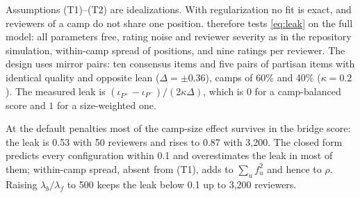 Assumptions (T1)--(T2) are idealizations. With regularization no fit is exact, and reviewers of a camp
do not share one position.  therefore tests \eqref{eq:leak} on the full model:
all parameters free, rating noise and reviewer severity as in the repository simulation,
within-camp spread of positions, and nine ratings per reviewer. The design uses mirror pairs:
ten consensus items and five pairs of partisan items with identical quality and opposite lean
($\Delta=\pm0.36$), camps of 60\% and 40\% ($\kappa=0.2$). The measured leak is
$(\iota_{P^+}-\iota_{P^-})/(2\kappa\Delta)$, which is $0$ for a camp-balanced score and $1$ for a
size-weighted one.

\begin{table}[t]
\centering\small
\caption{Majoritarian leak $\ell$ of the bridge score: measured on the full model (mean of three
datasets; standard deviation in parentheses) against the prediction $1/(1+\rho)$ of
\cref{prop:leak} with $\gamma=1$. Mirror-pair design, 60/40 camps. The default penalties are
$\lambda_b/\lambda_f=5$. Source: \texttt{scripts/levelA\_leak.py}.}
\label{tab:leak}
\end{table}

\begin{finding}\label{find:leak}\empirical{}
At the default penalties most of the camp-size effect survives in the bridge score: the leak is
0.53 with 50 reviewers and rises to 0.87 with 3{,}200. The closed form predicts every configuration within
0.1 and overestimates the leak in most of them; within-camp spread, absent from (T1), adds to
$\sum_uf_u^2$ and hence to $\rho$. Raising $\lambda_b/\lambda_f$ to 500 keeps the leak below 0.1
up to 3{,}200 reviewers.
\end{finding}

